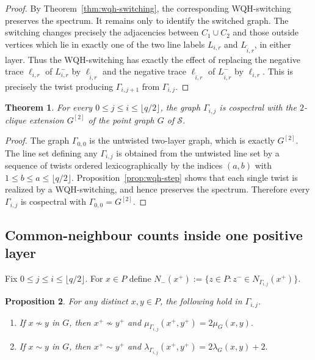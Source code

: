 \documentclass[reqno,a4paper,11pt]{article}
\newtheorem{thm}{Theorem}[section]
\newtheorem{pro}[thm]{Proposition}
\theoremstyle{definition}
\theoremstyle{remark}
\begin{document}
\begin{proof}
By Theorem~\ref{thm:wqh-switching}, the corresponding WQH-switching preserves the spectrum.
It remains only to identify the switched graph.
The switching changes precisely the adjacencies between $C_1\cup C_2$ and those outside vertices which lie in exactly one of the two line labels $L_{i,r}$ and $L_{\widetilde i,r}$, in either layer.
Thus the WQH-switching has exactly the effect of replacing the negative trace $\ell_{i,r}$ of $L_{i,r}^-$ by $\ell_{\widetilde i,r}$ and the negative trace $\ell_{\widetilde i,r}$ of $L_{\widetilde i,r}^-$ by $\ell_{i,r}$.
This is precisely the twist producing $\Gamma_{i,j+1}$ from $\Gamma_{i,j}$.
\end{proof}

\begin{thm}\label{thm:tpl-cospectral}
For every $0\le j\le i\le \lfloor q/2\rfloor$, the graph $\Gamma_{i,j}$ is cospectral with the $2$-clique extension $G^{[2]}$ of the point graph $G$ of $\mathcal S$.
\end{thm}

\begin{proof}
The graph $\Gamma_{0,0}$ is the untwisted two-layer graph, which is exactly $G^{[2]}$.
The line set defining any $\Gamma_{i,j}$ is obtained from the untwisted line set by a sequence of twists ordered lexicographically by the indices $(a,b)$ with $1\le b\le a\le \lfloor q/2\rfloor$.
Proposition~\ref{prop:wqh-step} shows that each single twist is realized by a WQH-switching, and hence preserves the spectrum.
Therefore every $\Gamma_{i,j}$ is cospectral with $\Gamma_{0,0}=G^{[2]}$.
\end{proof}

\subsection{Common-neighbour counts inside one positive layer}

Fix $0\le j\le i\le \lfloor q/2\rfloor$.
For $x\in P$ define
$N_-(x^+):=\{z\in P:z^-\in N_{\Gamma_{i,j}}(x^+)\}.$

\begin{pro}\label{prop:same-layer}
For any distinct \(x,y\in P\), the following hold in \(\Gamma_{i,j}\).
\begin{enumerate}[label=(\roman*)]
\item If $x\nsim y$ in $G$, then $x^+\nsim y^+$ and
$\mu_{\Gamma_{i,j}}(x^+,y^+)=2\mu_G(x,y).$
\item If $x\sim y$ in $G$, then $x^+\sim y^+$ and
$\lambda_{\Gamma_{i,j}}(x^+,y^+)=2\lambda_G(x,y)+2.$
\end{enumerate}
\end{pro}
\end{document}
